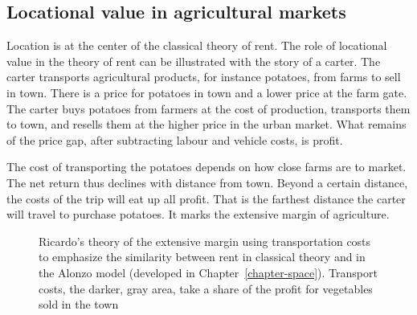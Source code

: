 
\subsection{Locational value in agricultural markets}
Location is at the center of the classical theory of rent. The role of locational value in the theory of \gls{rent} can be illustrated with the story of a carter. The carter transports agricultural products, for instance potatoes, from farms to sell in town. %
There is a price for potatoes in town and a lower price at the farm gate. The carter buys potatoes from farmers at the cost of production, transports them to town, and resells them at the higher price in the urban market. What remains of the price gap, after subtracting labour and vehicle costs, is profit. %

The cost of transporting the potatoes depends on how close farms are to market.  
The net return thus declines with distance from town. Beyond a certain distance, the costs of the trip will eat up all profit. That is the farthest distance the carter will travel to purchase potatoes. It marks the \gls{extensive margin} of agriculture. 

\begin{figure}[htb]
\begin{center}

\caption[Ricardo's theory of extensive margin.]{Ricardo's theory of the extensive margin using transportation costs to emphasize the similarity between rent in classical theory and in the Alonzo model (developed in  Chapter~\ref{chapter-space}). Transport costs, the darker, gray area, take a share of the profit for vegetables sold in the town}
\label{fig-rent-ricardo}
\end{center}
\end{figure}



